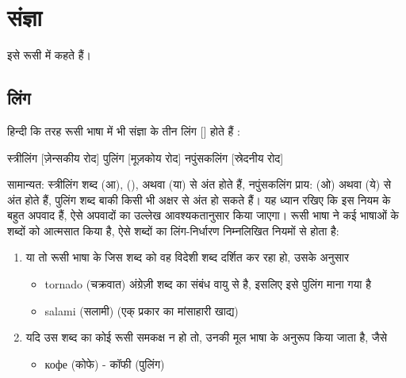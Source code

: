 \chapter{संज्ञा}\label{ch: noun}
इसे रूसी में  कहते हैं।

\section{लिंग}\label{sec:noun-gender}
हिन्दी कि तरह रूसी भाषा में भी संज्ञा के तीन लिंग []  होते हैं :

स्त्रीलिंग   [ज़ेन्सकीय रोद]
पुलिंग  [मूज़कोय रोद]
नपुंसकलिंग  [स्रेदनीय रोद]

सामान्यत: स्त्रीलिंग शब्द  (आ),  (),  अथवा  (या)  से अंत होते हैं, नपुंसकलिंग प्राय:  (ओ) अथवा
 (ये) से अंत होते हैं, पुलिंग शब्द बाकी किसी भी अक्षर से अंत हो सकते हैं। यह ध्यान रखिए कि इस नियम के बहुत अपवाद हैं, ऐसे अपवादों का उल्लेख
आवश्यकतानुसार किया जाएगा। रूसी भाषा ने कई भाषाओं के शब्दों को आत्मसात किया है, ऐसे शब्दों का लिंग-निर्धारण निम्नलिखित नियमों से होता है:
\begin{enumerate}
    \item या तो रूसी भाषा के जिस शब्द को वह विदेशी शब्द दर्शित कर रहा हो, उसके अनुसार
    \begin{itemize}
        \item tornado (चक्रवात) अंग्रेज़ी शब्द का संबंध वायु से है, इसलिए इसे पुलिंग माना गया है
        \item salami (सलामी) (एक् प्रकार का मांसाहारी खाद्य)
    \end{itemize}
    \item  यदि उस शब्द का कोई रूसी समकक्ष न हो तो, उनकी मूल भाषा के अनुरूप किया जाता है, जैसे
    \begin{itemize}
        \item кофе (कोफे) - कॉफी (पुलिंग)
    \end{itemize}
\end{enumerate}





